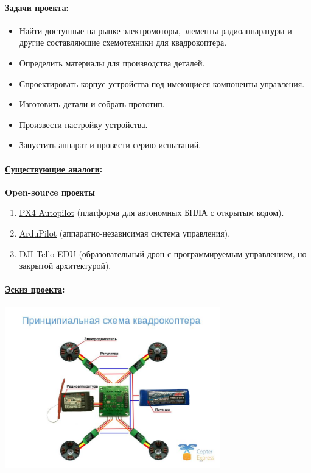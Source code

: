 \documentclass[a4paper,12pt]{article} %
\begin{document}
\paragraph{\underline{Задачи проекта}:}
\begin{itemize}
    \item Найти доступные на рынке электромоторы, элементы радиоаппаратуры и другие составляющие схемотехники для квадрокоптера.
    \item Определить материалы для производства деталей.
    \item Спроектировать корпус устройства под имеющиеся компоненты управления.
    \item Изготовить детали и собрать прототип.
    \item Произвести настройку устройства.
    \item Запустить аппарат и провести серию испытаний.

\end{itemize}

\paragraph{\underline{Существующие аналоги}:}

\textbf{Open-source проекты}
\begin{enumerate}
    \item \href{https://px4.io}{PX4 Autopilot} (платформа для автономных БПЛА с открытым кодом).
    \item \href{https://ardupilot.org}{ArduPilot} (аппаратно-независимая система управления).
    \item \href{https://www.dji.com/ru}{DJI Tello EDU} (образовательный дрон с программируемым управлением, но закрытой архитектурой).
\end{enumerate}

\paragraph{\underline{Эскиз проекта}:}
\begin{center}
    \includegraphics[width=0.7\textwidth]{img/drone.jpg} \\
\end{center}
\end{document}
